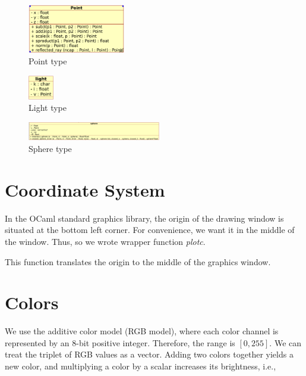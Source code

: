 \documentclass[conference]{IEEEtran}
\begin{document}
\begin{figure}[htbp]
  \centerline{\includegraphics[width=0.38\textwidth]{./figs/pointdiagram.png}}
  \caption{Point type}
  \label{Point type}
\end{figure}

\begin{figure}[htbp]
  \centerline{\includegraphics[width=0.1\textwidth]{./figs/lightdigram.png}}
  \caption{Light type}
  \label{Light type}
\end{figure}

\begin{figure}[htbp]
  \centerline{\includegraphics[width=0.52\textwidth]{./figs/spherediagram.png}}
  \caption{Sphere type}
  \label{Sphere type}
\end{figure}

\section{Coordinate System}

In the OCaml standard graphics library, the origin of the drawing window is situated at the bottom left corner. For convenience, we want it in the middle of the window. Thus, so we wrote wrapper function \textit{plotc}.

This function translates the origin to the middle of the graphics window.

\section{Colors}

We use the additive color model (RGB model), where each color channel is represented by an 8-bit positive integer. Therefore, the range is $[0,255]$. We can treat the triplet of RGB values as a vector. Adding two colors together yields a new color, and multiplying a color by a scalar increases its brightness, i.e.,
\end{document}
